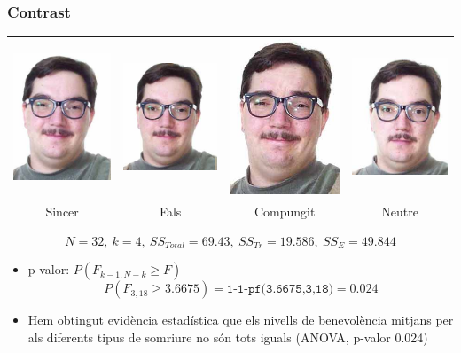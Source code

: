 \documentclass[12pt,t]{beamer}
\renewcommand{\geq}{\geqslant}
\theoremstyle{plain}
\theoremstyle{definition}
\begin{document}
\begin{frame}
\frametitle{Contrast}

\begin{center}
\hspace*{-0.5cm}\begin{tabular}{cccc}
\includegraphics[width=0.14\linewidth]{felt} & 
\includegraphics[width=0.15\linewidth]{false} & 
\includegraphics[width=0.125\linewidth]{miserable} & 
\includegraphics[width=0.15\linewidth]{neutral}\\
Sincer & Fals & Compungit & Neutre
\end{tabular}
\end{center}
$$
N=32,\ k=4,\ SS_{Total}=69.43,\ SS_{Tr}=19.586,\ SS_E=49.844
$$

\begin{itemize}


\item p-valor: $P(F_{k-1,N-k}\geq F)$
$$
P(F_{3,18}\geq 3.6675) =\texttt{1-1-pf(3.6675,3,18)}=0.024
$$\pause\vspace*{-2ex}

\item Hem obtingut evidència estadística que els nivells de benevolència mitjans per als diferents tipus de somriure no són tots iguals (ANOVA, p-valor 0.024)
\end{itemize}
\end{frame}
\end{document}
